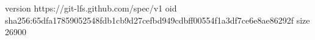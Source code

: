 version https://git-lfs.github.com/spec/v1
oid sha256:65dfa17859052548fdb1cb9d27cefbd949cdbff00554f1a3df7ce6e8ae86292f
size 26900
